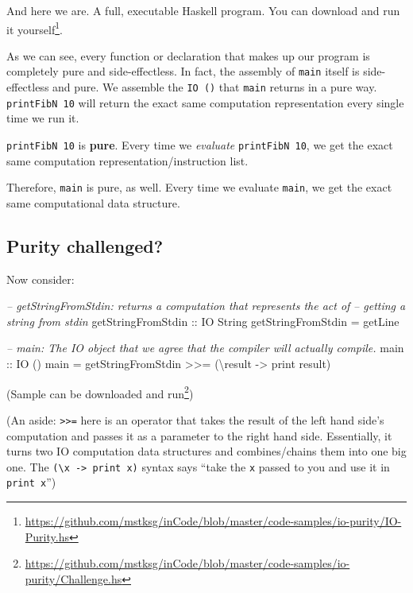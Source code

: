 \documentclass[]{article}
\newenvironment{Shaded}{}{}
\newcommand{\DataTypeTok}[1]{\textcolor[rgb]{0.56,0.13,0.00}{{#1}}}
\newcommand{\CommentTok}[1]{\textcolor[rgb]{0.38,0.63,0.69}{\textit{{#1}}}}
\newcommand{\OtherTok}[1]{\textcolor[rgb]{0.00,0.44,0.13}{{#1}}}
\newcommand{\FunctionTok}[1]{\textcolor[rgb]{0.02,0.16,0.49}{{#1}}}
\newcommand{\NormalTok}[1]{{#1}}
\renewcommand{\href}[2]{#2\footnote{\url{#1}}}
\begin{document}
And here we are. A full, executable Haskell program. You can
\href{https://github.com/mstksg/inCode/blob/master/code-samples/io-purity/IO-Purity.hs}{download
and run it yourself}.

As we can see, every function or declaration that makes up our program
is completely pure and side-effectless. In fact, the assembly of
\texttt{main} itself is side-effectless and pure. We assemble the
\texttt{IO\ ()} that \texttt{main} returns in a pure way.
\texttt{printFibN\ 10} will return the exact same computation
representation every single time we run it.

\texttt{printFibN\ 10} is \textbf{pure}. Every time we \emph{evaluate}
\texttt{printFibN\ 10}, we get the exact same computation
representation/instruction list.

Therefore, \texttt{main} is pure, as well. Every time we evaluate
\texttt{main}, we get the exact same computational data structure.

\subsection{Purity challenged?}\label{purity-challenged}

Now consider:

\begin{Shaded}
\begin{Highlighting}[]
\CommentTok{--  getStringFromStdin: returns a computation that represents the act of}
\CommentTok{--      getting a string from stdin}
\OtherTok{getStringFromStdin ::} \DataTypeTok{IO} \DataTypeTok{String}
\NormalTok{getStringFromStdin }\FunctionTok{=} \NormalTok{getLine}

\CommentTok{--  main: The IO object that we agree that the compiler will actually compile.}
\OtherTok{main ::} \DataTypeTok{IO} \NormalTok{()}
\NormalTok{main }\FunctionTok{=} \NormalTok{getStringFromStdin }\FunctionTok{>>=} \NormalTok{(\textbackslash{}result }\OtherTok{->} \NormalTok{print result)}
\end{Highlighting}
\end{Shaded}

(Sample can be
\href{https://github.com/mstksg/inCode/blob/master/code-samples/io-purity/Challenge.hs}{downloaded
and run})

(An aside: \texttt{\textgreater{}\textgreater{}=} here is an operator
that takes the result of the left hand side's computation and passes it
as a parameter to the right hand side. Essentially, it turns two IO
computation data structures and combines/chains them into one big one.
The \texttt{(\textbackslash{}x\ -\textgreater{}\ print\ x)} syntax says
``take the \texttt{x} passed to you and use it in \texttt{print\ x}'')
\end{document}
